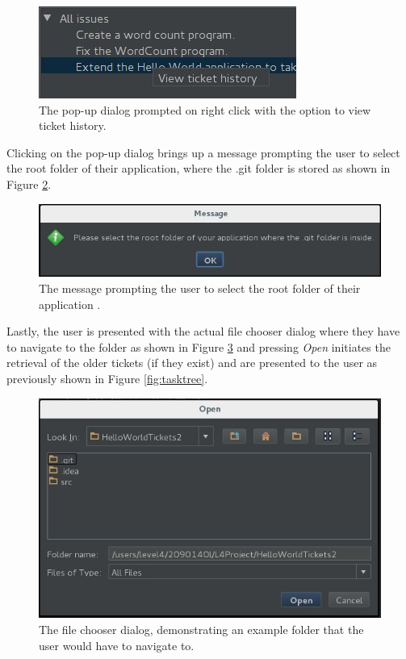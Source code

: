 \documentclass{4thYearProject}
\begin{document}
\begin{figure}[H]
\includegraphics[scale=0.7]{View_history}
\centering
\caption{The pop-up dialog prompted on right click with the option to view ticket history.}
\label{fig:popup}
\end{figure}

Clicking on the pop-up dialog brings up a message prompting the user to select the root folder of their application, where the .git folder is stored as shown in Figure \ref{fig:selectfolder}.

\begin{figure}[H]
\includegraphics[scale=0.7]{Folder_select_message}
\centering
\caption{The message prompting the user to select the root folder of their application .}
\label{fig:selectfolder}
\end{figure}

Lastly, the user is presented with the actual file chooser dialog where they have to navigate to the folder as shown in Figure \ref{fig:filechooser} and pressing \textit{Open} initiates the retrieval of the older tickets (if they exist) and are presented to the user as previously shown in Figure \ref{fig:tasktree}.

\begin{figure}[H]
\includegraphics[scale=0.7]{File_chooser}
\centering
\caption{The file chooser dialog, demonstrating an example folder that the user would have to navigate to.}
\label{fig:filechooser}
\end{figure}
\end{document}
